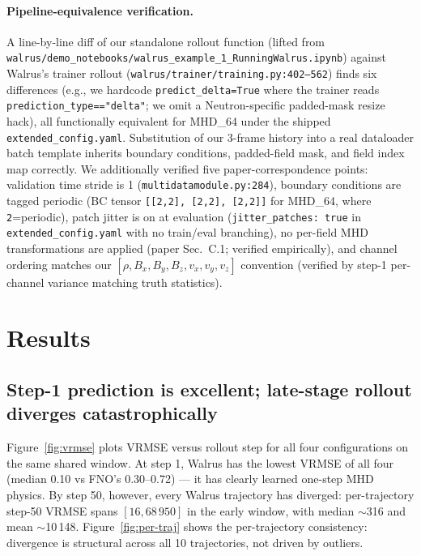 \documentclass{article}
\begin{document}
\paragraph{Pipeline-equivalence verification.} A line-by-line diff of our standalone rollout function (lifted from \texttt{walrus/demo\_notebooks/walrus\_example\_1\_RunningWalrus.ipynb}) against Walrus's trainer rollout (\texttt{walrus/trainer/training.py:402--562}) finds six differences (e.g., we hardcode \texttt{predict\_delta=True} where the trainer reads \texttt{prediction\_type=="delta"}; we omit a Neutron-specific padded-mask resize hack), all functionally equivalent for MHD\_64 under the shipped \texttt{extended\_config.yaml}. Substitution of our 3-frame history into a real dataloader batch template inherits boundary conditions, padded-field mask, and field index map correctly. We additionally verified five paper-correspondence points: validation time stride is 1 (\texttt{multidatamodule.py:284}), boundary conditions are tagged periodic (BC tensor \texttt{[[2,2],\,[2,2],\,[2,2]]} for MHD\_64, where \texttt{2}=periodic), patch jitter is on at evaluation (\texttt{jitter\_patches: true} in \texttt{extended\_config.yaml} with no train/eval branching), no per-field MHD transformations are applied (paper Sec.~C.1; verified empirically), and channel ordering matches our $[\rho, B_x, B_y, B_z, v_x, v_y, v_z]$ convention (verified by step-1 per-channel variance matching truth statistics).

\section{Results}

\subsection{Step-1 prediction is excellent; late-stage rollout diverges catastrophically}

Figure~\ref{fig:vrmse} plots VRMSE versus rollout step for all four configurations on the same shared window. At step 1, Walrus has the lowest VRMSE of all four (median 0.10 vs FNO's 0.30--0.72) --- it has clearly learned one-step MHD physics. By step 50, however, every Walrus trajectory has diverged: per-trajectory step-50 VRMSE spans $[16, 68\,950]$ in the early window, with median $\sim$316 and mean $\sim$10\,148. Figure~\ref{fig:per-traj} shows the per-trajectory consistency: divergence is structural across all 10 trajectories, not driven by outliers.
\end{document}
